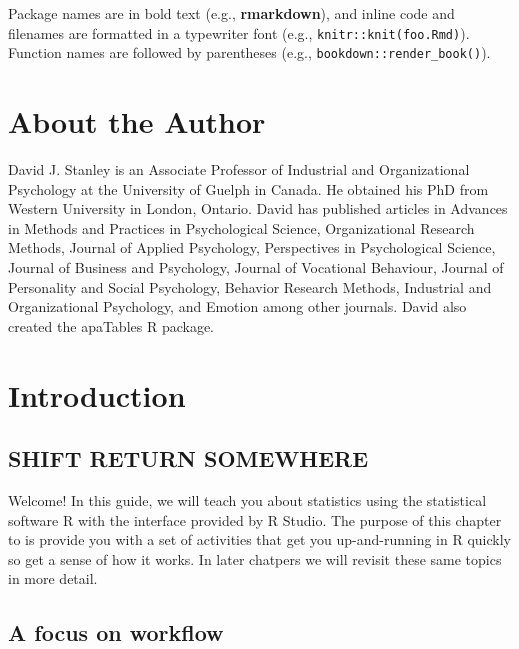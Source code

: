 \documentclass[
]{krantz}
\begin{document}
Package names are in bold text (e.g., \textbf{rmarkdown}), and inline code and filenames are formatted in a typewriter font (e.g., \texttt{knitr::knit(\textquotesingle{}foo.Rmd\textquotesingle{})}). Function names are followed by parentheses (e.g., \texttt{bookdown::render\_book()}).

\hypertarget{about-the-author}{%
\chapter*{About the Author}\label{about-the-author}}


David J. Stanley is an Associate Professor of Industrial and Organizational Psychology at the University of Guelph in Canada. He obtained his PhD from Western University in London, Ontario. David has published articles in Advances in Methods and Practices in Psychological Science, Organizational Research Methods, Journal of Applied Psychology, Perspectives in Psychological Science, Journal of Business and Psychology, Journal of Vocational Behaviour, Journal of Personality and Social Psychology, Behavior Research Methods, Industrial and Organizational Psychology, and Emotion among other journals. David also created the apaTables R package.

\mainmatter

\hypertarget{introduction}{%
\chapter{Introduction}\label{introduction}}

\hypertarget{shift-return-somewhere}{%
\section{SHIFT RETURN SOMEWHERE}\label{shift-return-somewhere}}

Welcome! In this guide, we will teach you about statistics using the statistical software R with the interface provided by R Studio. The purpose of this chapter to is provide you with a set of activities that get you up-and-running in R quickly so get a sense of how it works. In later chatpers we will revisit these same topics in more detail.

\hypertarget{a-focus-on-workflow}{%
\section{A focus on workflow}\label{a-focus-on-workflow}}
\end{document}
